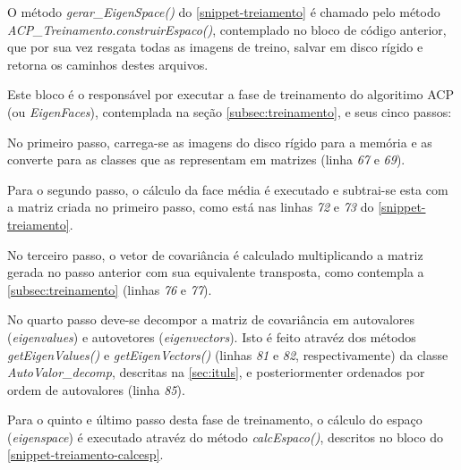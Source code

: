 O método \textit{gerar\_EigenSpace()} do \autoref{snippet-treiamento} é chamado pelo método \textit{ACP\_Treinamento.construirEspaco()}, contemplado no bloco de código anterior, que por sua vez resgata todas as imagens de treino, salvar em disco rígido e retorna os caminhos destes arquivos.

\codigoJava



Este bloco é o responsável por executar a fase de treinamento do algoritimo ACP (ou \textit{EigenFaces}), contemplada na seção \autoref{subsec:treinamento}, e seus cinco passos:

No primeiro passo, carrega-se as imagens do disco rígido para a memória e as converte para as classes que as representam em matrizes (linha \textit{67} e \textit{69}). 

Para o segundo passo, o cálculo da face média é executado e subtrai-se esta com a matriz criada no primeiro passo, como está nas linhas \textit{72} e \textit{73} do  \autoref{snippet-treiamento}.

No terceiro passo, o vetor de covariância é calculado multiplicando a matriz gerada no passo anterior com sua equivalente transposta, como contempla a \autoref{subsec:treinamento} (linhas \textit{76} e \textit{77}).

No quarto passo deve-se decompor a matriz de covariância em autovalores (\textit{eigenvalues}) e autovetores (\textit{eigenvectors}). Isto é feito atravéz dos métodos \textit{getEigenValues()} e \textit{getEigenVectors()} (linhas \textit{81} e \textit{82}, respectivamente) da classe \textit{AutoValor\_decomp}, descritas na \autoref{sec:ituls}, e posteriormenter ordenados por ordem de autovalores (linha \textit{85}).



Para o quinto e último passo desta fase de treinamento, o cálculo do espaço (\textit{eigenspace}) é executado atravéz do método \textit{calcEspaco()}, descritos no bloco do \autoref{snippet-treiamento-calcesp}. 


